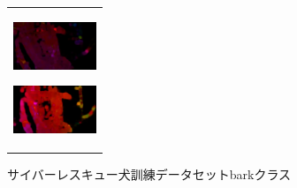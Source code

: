 \begin{enumerate}
\begin{end}
\begin{figure}[H]
\begin{tabular}{l}
\begin{minipage}{0.165\hsize}
        \begin{center}
          \includegraphics[clip, width=2.5cm]{./Figures/optic_bark4.eps}
          \hspace{0.1cm} { }
        \end{center}
      \end{minipage}
      \begin{minipage}{0.165\hsize}
        \begin{center}
          \includegraphics[clip, width=2.5cm]{./Figures/optic_bark5.eps}
          \hspace{2.2cm} { }
        \end{center}
      \end{minipage}
    \end{tabular}
    \caption{サイバーレスキュー犬訓練データセットbarkクラス}
    \label{bark}
\end{figure}

\begin{figure}[H]
    \begin{tabular}{l}

\\ %


\end{tabular}
\end{figure}
\end{end}
\end{enumerate}
